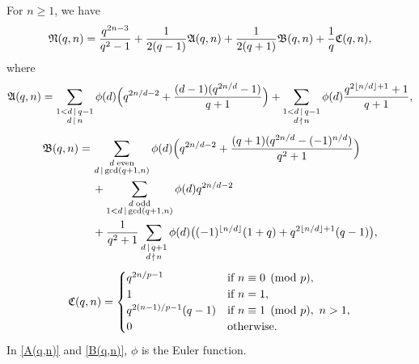 \documentclass[10pt,a4paper]{amsart}
\begin{document}
\begin{thm}\label{T-main} 
For $n\ge 1$, we have 
\begin{equation}\label{6.1}
\frak N(q,n)=\frac{q^{2n-3}}{q^2-1}+\frac 1{2(q-1)}\frak A(q,n)+\frac 1{2(q+1)}\frak B(q,n)+\frac 1q\frak C(q,n),
\end{equation}
where
\begin{equation}\label{A(q,n)}
\frak A(q,n)=\sum_{\substack{1<d\,\mid\, q-1\cr d\,\mid\, n}}\phi(d)\Bigl(q^{2n/d-2}+\frac{(d-1)(q^{2n/d}-1)}{q+1}\Bigr)+\sum_{\substack{1<d\,\mid\, q-1\cr d\,\nmid\, n}}\phi(d)\frac{q^{2\lfloor n/d\rfloor+1}+1}{q+1},
\end{equation}
\begin{align}\label{B(q,n)}
\frak B(q,n)=\,&\sum_{\substack{d\; \text{\rm even}\cr d\,\mid\,\text{\rm gcd}(q+1,n)}}\phi(d)\Bigl(q^{2n/d-2}+\frac{(q+1)(q^{2n/d}-(-1)^{n/d})}{q^2+1}\Bigr)\\
&+\sum_{\substack{d\; \text{\rm odd}\cr 1<d\,\mid\,\text{\rm gcd}(q+1,n)}}\phi(d)q^{2n/d-2}\cr
&+\frac 1{q^2+1}\sum_{\substack{d\,\mid\, q+1\cr d\,\nmid\, n}}\phi(d)\bigl((-1)^{\lfloor n/d\rfloor}(1+q)+q^{2\lfloor n/d\rfloor+1}(q-1)\bigr),\nonumber
\end{align}
\begin{equation}\label{C(q,n)}
\frak C(q,n)=\begin{cases}
q^{2n/p-1}&\text{if}\ n\equiv 0\pmod p,\cr
1&\text{if}\ n=1,\cr
q^{2(n-1)/p-1}(q-1)&\text{if}\ n\equiv 1\pmod p,\ n>1,\cr
0&\text{otherwise}.
\end{cases}
\end{equation}
In \eqref{A(q,n)} and \eqref{B(q,n)}, $\phi$ is the Euler function.
\end{thm}
\end{document}
